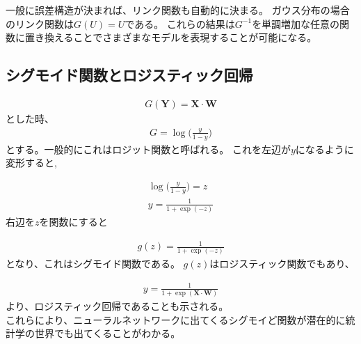 一般に誤差構造が決まれば、リンク関数も自動的に決まる。
ガウス分布の場合のリンク関数は$ G(U) = U $である。
これらの結果は$ G^{-1} $を単調増加な任意の関数に置き換えることでさまざまなモデルを表現することが可能になる。


\subsection{シグモイド関数とロジスティック回帰}
\begin{eqnarray}
G(\mathbf{Y})=\mathbf{X}\cdot  \mathbf{W}
\end{eqnarray}
とした時、
\begin{eqnarray}
G=\log \bigl(\frac{y}{1-y}\bigr)
\end{eqnarray}
とする。一般的にこれはロジット関数と呼ばれる。
これを左辺が$ y $になるように変形すると,

\begin{eqnarray}
\log \bigl(\frac{y}{1-y}\bigr) = z \\
y = \frac{1}{1 + \exp(-z)}
\end{eqnarray}
右辺を$ z $を関数にすると

\begin{eqnarray}
g(z) = \frac{1}{1 + \exp(-z)}
\end{eqnarray}
となり、これはシグモイド関数である。
$ g(z) $はロジスティック関数でもあり、


\begin{eqnarray}
y = \frac{1}{1 + \exp (\mathbf{X} \cdot  \mathbf{W})}
\end{eqnarray}
より、ロジスティック回帰であることも示される。 \\

これらにより、ニューラルネットワークに出てくるシグモイど関数が潜在的に統計学の世界でも出てくることがわかる。







